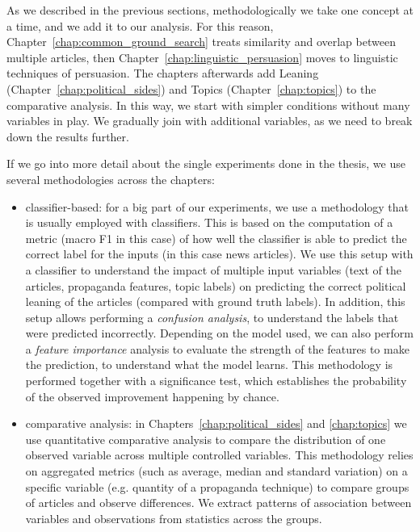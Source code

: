 As we described in the previous sections, methodologically we take one concept at a time, and we add it to our analysis. For this reason, Chapter~\ref{chap:common_ground_search} treats similarity and overlap between multiple articles, then Chapter~\ref{chap:linguistic_persuasion} moves to linguistic techniques of persuasion. The chapters afterwards add Leaning (Chapter~\ref{chap:political_sides}) and Topics (Chapter~\ref{chap:topics}) to the comparative analysis. In this way, we start with simpler conditions without many variables in play. We gradually join with additional variables, as we need to break down the results further.


If we go into more detail about the single experiments done in the thesis, we use several methodologies across the chapters:
\begin{itemize}
    \item classifier-based: for a big part of our experiments, we use a methodology that is usually employed with classifiers. This is based on the computation of a metric (macro F1 in this case) of how well the classifier is able to predict the correct label for the inputs (in this case news articles). We use this setup with a classifier to understand the impact of multiple input variables (text of the articles, propaganda features, topic labels) on predicting the correct political leaning of the articles (compared with ground truth labels).
          In addition, this setup allows performing a \emph{confusion analysis}, to understand the labels that were predicted incorrectly. Depending on the model used, we can also perform a \emph{feature importance} analysis to evaluate the strength of the features to make the prediction, to understand what the model learns. This methodology is performed together with a significance test, which establishes the probability of the observed improvement happening by chance.
    \item comparative analysis: in Chapters~\ref{chap:political_sides} and \ref{chap:topics} we use quantitative comparative analysis
          to compare the distribution of one observed variable across multiple controlled variables. This methodology relies on aggregated metrics (such as average, median and standard variation) on a specific variable (e.g. quantity of a propaganda technique) to compare groups of articles and observe differences. We extract patterns of association between variables and observations from statistics across the groups.
\end{itemize}



